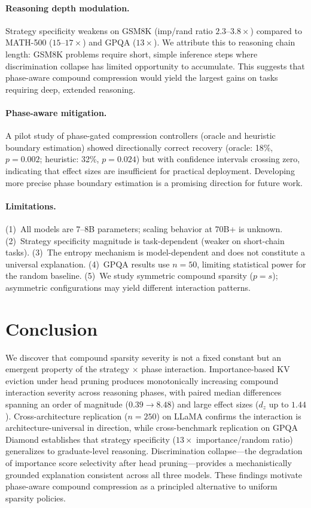 \documentclass[11pt,a4paper]{article}
\begin{document}
\paragraph{Reasoning depth modulation.}
Strategy specificity weakens on GSM8K (imp/rand ratio $2.3$--$3.8\times$) compared to MATH-500 ($15$--$17\times$) and GPQA ($13\times$).
We attribute this to reasoning chain length: GSM8K problems require short, simple inference steps where discrimination collapse has limited opportunity to accumulate.
This suggests that phase-aware compound compression would yield the largest gains on tasks requiring deep, extended reasoning.

\paragraph{Phase-aware mitigation.}
A pilot study of phase-gated compression controllers (oracle and heuristic boundary estimation) showed directionally correct recovery (oracle: 18\%, $p = 0.002$; heuristic: 32\%, $p = 0.024$) but with confidence intervals crossing zero, indicating that effect sizes are insufficient for practical deployment.
Developing more precise phase boundary estimation is a promising direction for future work.

\paragraph{Limitations.}
(1)~All models are 7--8B parameters; scaling behavior at 70B+ is unknown.
(2)~Strategy specificity magnitude is task-dependent (weaker on short-chain tasks).
(3)~The entropy mechanism is model-dependent and does not constitute a universal explanation.
(4)~GPQA results use $n\!=\!50$, limiting statistical power for the random baseline.
(5)~We study symmetric compound sparsity ($p = s$); asymmetric configurations may yield different interaction patterns.

\section{Conclusion}
\label{sec:conclusion}

We discover that compound sparsity severity is not a fixed constant but an emergent property of the strategy $\times$ phase interaction.
Importance-based KV eviction under head pruning produces monotonically increasing compound interaction severity across reasoning phases, with paired median differences spanning an order of magnitude ($0.39 \to 8.48$) and large effect sizes ($d_z$ up to $1.44$).
Cross-architecture replication ($n\!=\!250$) on LLaMA confirms the interaction is architecture-universal in direction, while cross-benchmark replication on GPQA Diamond establishes that strategy specificity ($13\times$ importance/random ratio) generalizes to graduate-level reasoning.
Discrimination collapse---the degradation of importance score selectivity after head pruning---provides a mechanistically grounded explanation consistent across all three models.
These findings motivate phase-aware compound compression as a principled alternative to uniform sparsity policies.
\end{document}
